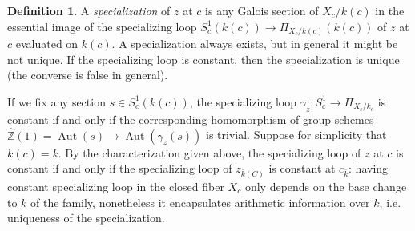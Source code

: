 \documentclass[11pt]{amsart}
\theoremstyle{plain}
\newtheorem{lemma}[theorem]{Lemma}
\theoremstyle{definition}
\newtheorem{definition}[theorem]{Definition}
\newcommand{\on}{\operatorname}
\newcommand{\1}{\mathbb{1}}
\newcommand{\hz}{\hat{\mathbb{Z}}}
\newcommand{\mc}{\mathcal}
\newcommand{\spec}{\on{Spec}}
\newcommand{\uaut}{\underline{\on{Aut}}}
\renewcommand{\O}{\mc{O}}
\renewcommand{\hat}{\widehat}
\begin{document}


\begin{definition}\label{loopdef}
	A \emph{specialization} of $z$ at $c$ is any Galois section of $X_{c}/k(c)$ in the essential image of the specializing loop $S^{1}_{c}(k(c))\to\Pi_{X_{c}/k(c)}(k(c))$ of $z$ at $c$ evaluated on $k(c)$. A specialization always exists, but in general it might be not unique. If the specializing loop is constant, then the specialization is unique (the converse is false in general).
\end{definition}

If we fix any section $s\in S^{1}_{c}(k(c))$, the specializing loop $\gamma_{z}:S^{1}_{c}\to\Pi_{X_{c}/k_{c}}$ is constant if and only if the corresponding homomorphism of group schemes $\hz(1)=\uaut(s)\to\uaut(\gamma_{z}(s))$ is trivial. Suppose for simplicity that $k(c)=k$. By the characterization given above, the specializing loop of $z$ at $c$ is constant if and only if the specializing loop of $z_{\bar{k}(C)}$ is constant at $c_{\bar{k}}$: having constant specializing loop in the closed fiber $X_{c}$ only depends on the base change to $\bar{k}$ of the family, nonetheless it encapsulates arithmetic information over $k$, i.e. uniqueness of the specialization.

\end{document}
